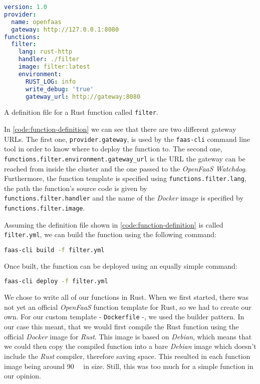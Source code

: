 \begin{code}[H]
  \centering
  \begin{lstlisting}[language=yaml]
version: 1.0
provider:
  name: openfaas
  gateway: http://127.0.0.1:8080
functions:
  filter:
    lang: rust-http
    handler: ./filter
    image: filter:latest
    environment:
      RUST_LOG: info
      write_debug: 'true'
      gateway_url: http://gateway:8080
  \end{lstlisting}
  \caption{A definition file for a Rust function called \texttt{filter}.}
  \label{code:function-definition}
\end{code}

In \autoref{code:function-definition} we can see that there are two different gateway URLs. The
first one, \texttt{provider.gateway}, is used by the \texttt{faas-cli} command line tool in order to
know where to deploy the function to. The second one, \\
\texttt{functions.filter.environment.gateway\_url} is the URL the gateway can be reached from inside
the cluster and the one passed to the \textit{OpenFaaS Watchdog}. Furthermore, the function template
is specified using \texttt{functions.filter.lang}, the path the function's source code is given by
\\
\texttt{functions.filter.handler} and the name of the \textit{Docker} image is specified by \\
\texttt{functions.filter.image}.

Assuming the definition file shown in \autoref{code:function-definition} is called
\texttt{filter.yml}, we can build the function using the following command:

\begin{lstlisting}[language=bash]
faas-cli build -f filter.yml
\end{lstlisting}

Once built, the function can be deployed using an equally simple command:

\begin{lstlisting}[language=bash]
faas-cli deploy -f filter.yml
\end{lstlisting}

We chose to write all of our functions in Rust. When we first started, there was not yet an official
\textit{OpenFaaS} function template for Rust, so we had to create our own. For our custom template -
\texttt{Dockerfile} -, we used the builder pattern. In our case this meant, that we would first
compile the Rust function using the official \textit{Docker} image for \textit{Rust}. This image is
based on \textit{Debian}, which means that we could then copy the compiled function into a bare
\textit{Debian} image which doesn't include the \textit{Rust} compiler, therefore saving space. This
resulted in each function image being around \SI{90}{\mega\byte} in size. Still, this was too much
for a simple function in our opinion.

